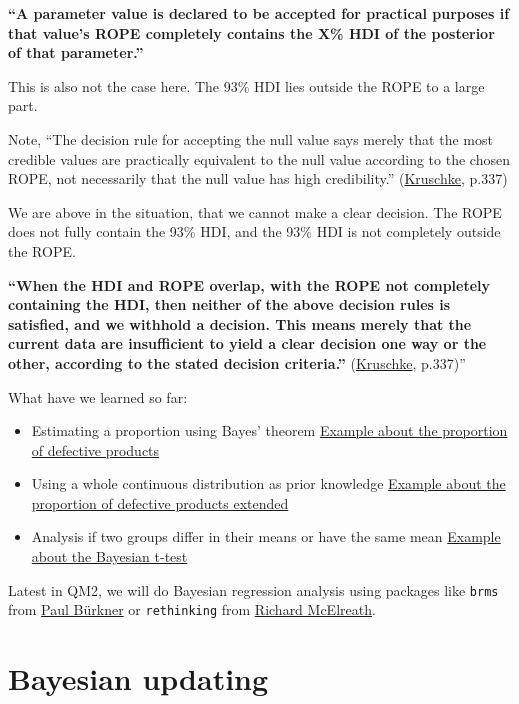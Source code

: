 \documentclass[
]{book}
\begin{document}
\textbf{``A parameter value is declared to be accepted for practical purposes if that value's
ROPE completely contains the X\% HDI of the posterior of that parameter.''}

This is also not the case here. The 93\% HDI lies outside the ROPE to a large part.

Note, ``The decision rule for accepting the null value says merely that the most
credible values are practically equivalent to the null value according to the
chosen ROPE, not necessarily that the null value has high credibility.''
(\href{https://nyu-cdsc.github.io/learningr/assets/kruschke_bayesian_in_R.pdf}{Kruschke}, p.337)

We are above in the situation, that we cannot make a clear decision.
The ROPE does not fully contain the 93\% HDI, and the 93\% HDI is not
completely outside the ROPE.

\textbf{``When the HDI and ROPE overlap, with the ROPE not completely
containing the HDI, then neither of the above decision rules is satisfied,
and we withhold a decision. This means merely that the current data are insufficient to
yield a clear decision one way or the other, according to the stated decision criteria.''}
(\href{https://nyu-cdsc.github.io/learningr/assets/kruschke_bayesian_in_R.pdf}{Kruschke}, p.337)''

What have we learned so far:

\begin{itemize}
\item
  Estimating a proportion using Bayes' theorem \hyperref[example_defective_products]{Example about the proportion of defective products}
\item
  Using a whole continuous distribution as prior knowledge \hyperref[example_defective_products_extended]{Example about the proportion of defective products extended}
\item
  Analysis if two groups differ in their means or have the same mean \hyperref[bayesian_t_test]{Example about the Bayesian t-test}
\end{itemize}

Latest in QM2, we will do Bayesian regression analysis using packages like \texttt{brms} from
\href{https://www.tu-dortmund.de/universitaet/neuberufene-professorinnen/prof-paul-christian-buerkner/}{Paul Bürkner} or
\texttt{rethinking} from \href{https://www.eva.mpg.de/ecology/staff/richard-mcelreath/}{Richard McElreath}.

\section{Bayesian updating}\label{bayesian-updating}
\end{document}
